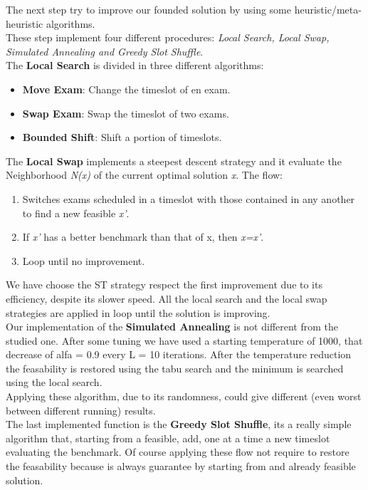 \documentclass[12pt]{article}
\begin{document}
The next step try to improve our founded solution by using some heuristic/meta-heuristic algorithms.\\
These step implement four different procedures: \textit{Local Search, Local Swap, Simulated Annealing and Greedy Slot Shuffle}.\\

The \textbf{Local Search} is divided in three different algorithms:
\begin{itemize}
  \item \textbf{Move Exam}: Change the timeslot of en exam.
  \item \textbf{Swap Exam}: Swap the timeslot of two exams.
  \item \textbf{Bounded Shift}: Shift a portion of timeslots.
\end{itemize}

The \textbf{Local Swap} implements a steepest descent strategy and it evaluate the Neighborhood \textit{N(x)} of the current optimal solution \textit{x}. The flow:
\begin{enumerate}
  \item Switches exams scheduled in a timeslot with those contained in any another to find a new feasible \textit{x'}.
  \item If \textit{x'} has a better benchmark than that of x, then \textit{x=x'}.
  \item Loop until no improvement.
\end{enumerate}
We have choose the ST strategy respect the first improvement due to its efficiency, despite its slower speed. All the local search and the local swap strategies are applied in loop until the solution is improving.\\

Our implementation of the \textbf{Simulated Annealing} is not different from the studied one. After some tuning we have used a starting temperature of 1000, that decrease of alfa = 0.9 every L = 10 iterations. After the temperature reduction the feasability is restored using the tabu search and the minimum is searched using the local search.\\
Applying these algorithm, due to its randomness, could give different (even worst between different running) results.\\

The last implemented function is the \textbf{Greedy Slot Shuffle}, its a really simple algorithm that, starting from a feasible, add, one at a time a new timeslot evaluating the benchmark. Of course applying these flow not require to restore the feasability because is always guarantee by starting from and already feasible solution.
\end{document}
